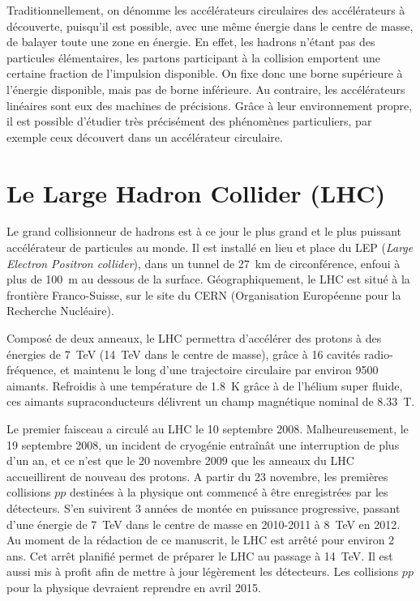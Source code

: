 Traditionnellement, on dénomme les accélérateurs circulaires des accélérateurs à découverte, puisqu'il est possible, avec une même énergie dans le centre de masse, de balayer toute une zone en énergie. En effet, les hadrons n'étant pas des particules élémentaires, les partons participant à la collision emportent une certaine fraction de l'impulsion disponible. On fixe donc une borne supérieure à l'énergie disponible, mais pas de borne inférieure. Au contraire, les accélérateurs linéaires sont eux des machines de précisions. Grâce à leur environnement propre, il est possible d'étudier très précisément des phénomènes particuliers, par exemple ceux découvert dans un accélérateur circulaire.

\section{Le Large Hadron Collider (LHC)}

Le grand collisionneur de hadrons est à ce jour le plus grand et le plus puissant accélérateur de particules au monde. Il est installé en lieu et place du LEP (\emph{Large Electron Positron collider}), dans un tunnel de \SI{27}{\km} de circonférence, enfoui à plus de \SI{100}{\m} au dessous de la surface. Géographiquement, le LHC est situé à la frontière Franco-Suisse, sur le site du CERN (Organisation Européenne pour la Recherche Nucléaire).

Composé de deux anneaux, le LHC permettra d'accélérer des protons à des énergies de \SI{7}{\TeV} (\SI{14}{\TeV} dans le centre de masse), grâce à 16 cavités radio-fréquence, et maintenu le long d'une trajectoire circulaire par environ 9500 aimants. Refroidis à une température de \SI{1.8}{\K} grâce à de l'hélium super fluide, ces aimants supraconducteurs délivrent un champ magnétique nominal de \SI{8.33}{\tesla}.

Le premier faisceau a circulé au LHC le 10 septembre 2008. Malheureusement, le 19 septembre 2008, un incident de cryogénie entraînât une interruption de plus d'un an, et ce n'est que le 20 novembre 2009 que les anneaux du LHC accueillirent de nouveau des protons. A partir du 23 novembre, les premières collisions $pp$ destinées à la physique ont commencé à être enregistrées par les détecteurs. S'en suivirent 3 années de montée en puissance progressive, passant d'une énergie de \SI{7}{\TeV} dans le centre de masse en 2010-2011 à \SI{8}{\TeV} en 2012. Au moment de la rédaction de ce manuscrit, le LHC est arrêté pour environ 2 ans. Cet arrêt planifié permet de préparer le LHC au passage à \SI{14}{\TeV}. Il est aussi mis à profit afin de mettre à jour légèrement les détecteurs. Les collisions $pp$ pour la physique devraient reprendre en avril 2015.


